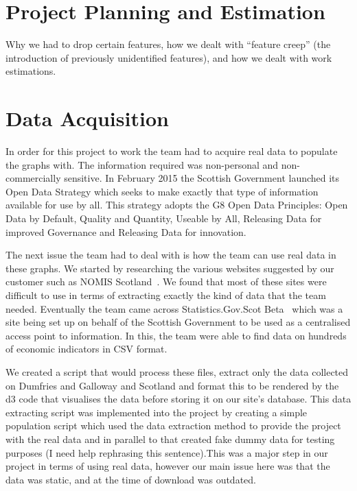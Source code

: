 \documentclass{l3proj}
\begin{document}


\section{Project Planning and Estimation}
\label{sec:planning}


Why we had to drop certain features, how we dealt with ``feature creep'' (the introduction of previously unidentified features), and how we dealt with work estimations.



\section{Data Acquisition}
\label{sec:data-acquisition}

In order for this project to work the team had to acquire real data to populate the graphs with. The information required was non-personal and non-commercially sensitive. In February 2015 the Scottish Government launched its Open Data Strategy which seeks to make exactly that type of information available for use by all. This strategy adopts the G8 Open Data Principles: Open Data by Default, Quality and Quantity, Useable by All, Releasing Data for improved Governance and Releasing Data for innovation. 

The next issue the team had to deal with is how the team can use real data in these graphs. We started by researching
the various websites suggested by our customer such as NOMIS Scotland~\cite{NOMISScot}. We found that most of these
sites were difficult to use in terms of extracting exactly the kind of data that the team needed. Eventually the team
came across Statistics.Gov.Scot Beta~\cite{StatisticsScotBeta} which was a site being set up on behalf of the Scottish
Government to be used as a centralised access point to information. In this, the team were able to find data on hundreds
of economic indicators in CSV format.

We created a script that would process these files, extract only the data collected on Dumfries and Galloway and
Scotland and format this to be rendered by the d3 code that visualises the data before storing it on our site's
database. This data extracting script was implemented into the project by creating a simple population script which used
the data extraction method to provide the project with the real data and in parallel to that created fake dummy data for
testing purposes (I need help rephrasing this sentence).This was a major step in our project in terms of using real
data, however our main issue here was that the data was static, and at the time of download was outdated.
\end{document}
